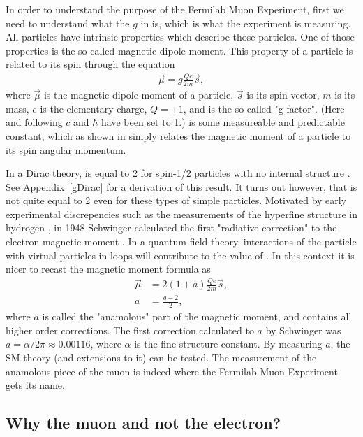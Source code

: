 In order to understand the purpose of the Fermilab Muon \gmtwo Experiment, first we need to understand what the $g$ in \gmtwo is, which is what the experiment is measuring. All particles have intrinsic properties which describe those particles. One of those properties is the so called magnetic dipole moment. This property of a particle is related to its spin through the equation
		\begin{align}
            \vec{\mu} = g \frac{Qe}{2m} \vec{s},
        \label{eq:magneticmoment}
		\end{align}
where $\vec{\mu}$ is the magnetic dipole moment of a particle, $\vec{s}$ is its spin vector, $m$ is its mass, $e$ is the elementary charge, $Q = \pm1$, and \g is the so called "g-factor". (Here and following $c$ and $\hbar$ have been set to 1.) \g is some measureable and predictable constant, which as shown in  simply relates the magnetic moment of a particle to its spin angular momentum. 

In a Dirac theory, \g is equal to 2 for spin-1/2 particles with no internal structure \cite{Dirac}. See Appendix~\ref{gDirac} for a derivation of this result. It turns out however, that \g is not quite equal to 2 even for these types of simple particles. Motivated by early experimental discrepencies such as the measurements of the hyperfine structure in hydrogen \cite{EarlyHyperfine1}, in 1948 Schwinger calculated the first "radiative correction" to the electron magnetic moment \cite{Schwinger}. In a quantum field theory, interactions of the particle with virtual particles in loops will contribute to the value of \g. In this context it is nicer to recast the magnetic moment formula as 
		\begin{equation}
		\begin{aligned}
            \vec{\mu} &= 2(1+a) \frac{Qe}{2m} \vec{s}, \\
            a &= \frac{g-2}{2},
        \label{eq:anamoly}
		\end{aligned}
		\end{equation}
where $a$ is called the "anamolous" part of the magnetic moment, and contains all higher order corrections. The first correction calculated to $a$ by Schwinger was $a = \alpha/2\pi \approx 0.00116$, where $\alpha$ is the fine structure constant. By measuring $a$, the SM theory (and extensions to it) can be tested. The measurement of the anamolous piece of the muon is indeed where the Fermilab Muon \gmtwo Experiment gets its name.


\subsection{Why the muon and not the electron?}

